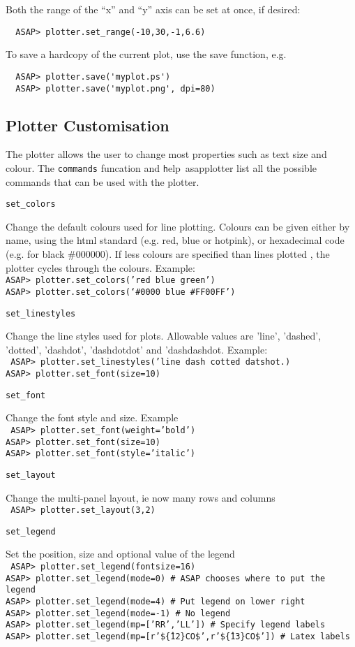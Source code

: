 \documentclass[11pt]{article}
\newcommand{\cmd}[1]{{\tt #1}}
\newcommand{\commanddef}[3]{
  \begin{minipage}[t]{27mm}\tt #1\end{minipage}\hspace{3mm}
  \begin{minipage}[t]{\textwidth-30mm}#2 \\ \tt #3\end{minipage}
}
\begin{document}
Both the range of the ``x'' and ``y'' axis can be set at once, if desired:

\begin{verbatim}
  ASAP> plotter.set_range(-10,30,-1,6.6)
\end{verbatim}

To save a hardcopy of the current plot, use the save function, e.g.

\begin{verbatim}
  ASAP> plotter.save('myplot.ps')
  ASAP> plotter.save('myplot.png', dpi=80)
\end{verbatim}

\subsection{Plotter Customisation}

The plotter allows the user to change most properties such as text
size and colour. The \cmd{commands} funcation and {\cmd help\
asapplotter} list all the possible commands that can be used with the
plotter.

\commanddef{set\_colors}{Change the default colours used for line
plotting. Colours can be given either by name, using the html standard
(e.g. red, blue or hotpink), or hexadecimal code (e.g. for black
\#000000). If less colours are specified than lines plotted , the
plotter cycles through the colours. Example:} {ASAP>
plotter.set\_colors('red blue green')\\ ASAP>
plotter.set\_colors(`\#0000 blue \#FF00FF')\\ }

\commanddef{set\_linestyles}{Change the line styles used for
plots. Allowable values are 'line', 'dashed', 'dotted', 'dashdot', 
'dashdotdot' and 'dashdashdot. Example: }{
  ASAP> plotter.set\_linestyles('line dash cotted datshot.)\\
  ASAP> plotter.set\_font(size=10)\\
}

\commanddef{set\_font}{Change the font style and size. Example}{
  ASAP> plotter.set\_font(weight='bold')\\
  ASAP> plotter.set\_font(size=10)\\
  ASAP> plotter.set\_font(style='italic')\\
}

\commanddef{set\_layout}{Change the multi-panel layout, ie now many
  rows and columns}{
  ASAP> plotter.set\_layout(3,2)
}

\commanddef{set\_legend}{Set the position, size and optional value of the legend}{
  ASAP> plotter.set\_legend(fontsize=16)\\
  ASAP> plotter.set\_legend(mode=0)  \# ASAP chooses where to put the legend\\
  ASAP> plotter.set\_legend(mode=4)  \# Put legend on lower right\\
  ASAP> plotter.set\_legend(mode=-1) \# No legend\\
  ASAP> plotter.set\_legend(mp=['RR','LL']) \# Specify legend labels\\
  ASAP> plotter.set\_legend(mp=[r'\$\^\{12\}CO\$',r'\$\^\{13\}CO\$']) \# Latex labels
}
\end{document}

